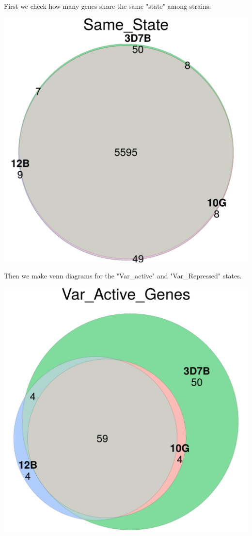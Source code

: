 \documentclass[11pt]{article}
\begin{document}
First we check how many genes share the same "state" among strains:

\begin{center}
\includegraphics[width=.9\linewidth]{./Plots/venn_Same_State.png}
\end{center}

Then we make venn diagrams for the "Var\_active" and "Var\_Repressed" states.

\begin{center}
\includegraphics[width=.9\linewidth]{./Plots/venn_Var_Active_Genes.png}
\end{center}
\end{document}
